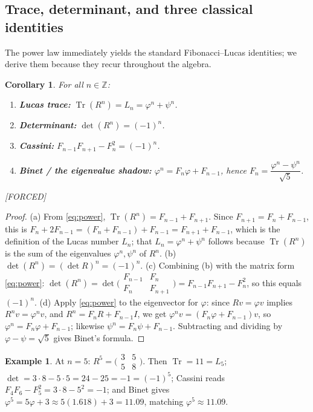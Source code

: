 \documentclass[11pt]{article}
\theoremstyle{plain}
\newtheorem{corollary}[theorem]{Corollary}
\theoremstyle{definition}
\newtheorem{example}[theorem]{Example}
\theoremstyle{remark}
\newcommand{\Forced}{\textcolor{forcedc}{[FORCED]}}
\newcommand{\Tr}{\operatorname{Tr}}
\begin{document}
\subsection{Trace, determinant, and three classical identities}
The power law immediately yields the standard Fibonacci--Lucas identities; we derive them because they recur throughout the algebra.

\begin{corollary}\label{cor:identities}
For all $n∈ℤ$:
\begin{enumerate}[label=\textup{(\alph*)},leftmargin=2em,itemsep=1pt]
\item \textbf{Lucas trace:} $\Tr(R^{n})=L_n=φ^{n}+ψ^{n}$.
\item \textbf{Determinant:} $\det(R^{n})=(-1)^{n}$.
\item \textbf{Cassini:} $F_{n-1}F_{n+1}-F_n^{2}=(-1)^{n}$.
\item \textbf{Binet / the eigenvalue shadow:} $φ^{n}=F_nφ+F_{n-1}$, hence $F_n=\dfrac{φ^{n}-ψ^{n}}{\sqrt5}$.
\end{enumerate}
\Forced
\end{corollary}
\begin{proof}
(a) From \eqref{eq:power}, $\Tr(R^{n})=F_{n-1}+F_{n+1}$. Since $F_{n+1}=F_n+F_{n-1}$, this is $F_n+2F_{n-1}=(F_n+F_{n-1})+F_{n-1}=F_{n+1}+F_{n-1}$, which is the definition of the Lucas number $L_n$; that $L_n=φ^{n}+ψ^{n}$ follows because $\Tr(R^{n})$ is the sum of the eigenvalues $φ^{n},ψ^{n}$ of $R^{n}$.
(b) $\det(R^{n})=(\det R)^{n}=(-1)^{n}$.
(c) Combining (b) with the matrix form \eqref{eq:power}: $\det(R^{n})=\det\bigl(\begin{smallmatrix}F_{n-1}&F_n\\ F_n&F_{n+1}\end{smallmatrix}\bigr)=F_{n-1}F_{n+1}-F_n^{2}$, so this equals $(-1)^{n}$.
(d) Apply \eqref{eq:power} to the eigenvector for $φ$: since $Rv=φv$ implies $R^{n}v=φ^{n}v$, and $R^{n}=F_nR+F_{n-1}I$, we get $φ^{n}v=(F_nφ+F_{n-1})v$, so $φ^{n}=F_nφ+F_{n-1}$; likewise $ψ^{n}=F_nψ+F_{n-1}$. Subtracting and dividing by $φ-ψ=\sqrt5$ gives Binet's formula.
\end{proof}

\begin{example}\label{ex:cassini}
At $n=5$: $R^{5}=\bigl(\begin{smallmatrix}3&5\\5&8\end{smallmatrix}\bigr)$. Then $\Tr=11=L_5$; $\det=3\cdot8-5\cdot5=24-25=-1=(-1)^{5}$; Cassini reads $F_4F_6-F_5^{2}=3\cdot8-5^{2}=-1$; and Binet gives $φ^{5}=5φ+3\approx 5(1.618)+3=11.09$, matching $φ^{5}\approx11.09$.
\end{example}
\end{document}
